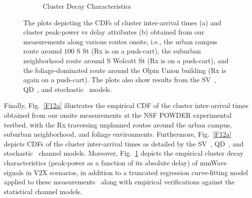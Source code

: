 \documentclass[10pt, twocolumn]{IEEEtran}
\begin{document}
{\begin{figure} [t]
\begin{subfigure}{0.495\linewidth}
        \caption{Cluster Decay Characteristics}
        \label{F12b}
    \end{subfigure}
    \vspace{-8mm}
    \caption{The plots depicting the CDFs of cluster inter-arrival times (a) and cluster peak-power vs delay attributes (b) obtained from our measurements along various routes onsite, i.e., the urban campus route around $100$ S St (Rx is on a push-cart), the suburban neighborhood route around S Wolcott St (Rx is on a push-cart), and the foliage-dominated route around the Olpin Union building (Rx is again on a push-cart). The plots also show results from the SV~\cite{SV_Molisch}, QD~\cite{QDC_NIST}, and stochastic~\cite{Indoor60G} models.}
    \label{F12}
\end{figure}

Finally, Fig.~\ref{F12a} illustrates the empirical CDF of the cluster inter-arrival times obtained from our onsite measurements at the NSF POWDER experimental testbed, with the Rx traversing unplanned routes around the urban campus, suburban neighborhood, and foliage environments. Furthermore, Fig.~\ref{F12a} depicts CDFs of the cluster inter-arrival times as detailed by the SV~\cite{SV_Molisch}, QD~\cite{QDC_NIST}, and stochastic~\cite{Indoor60G} channel models. Moreover, Fig.~\ref{F12b} depicts the empirical cluster decay characteristics (peak-power as a function of its absolute delay) of mmWave signals in V$2$X scenarios, in addition to a truncated regression curve-fitting model applied to these measurements~\cite{Indoor60G} along with empirical verifications against the statistical channel models.
\vspace{-3mm}

}
\end{document}
